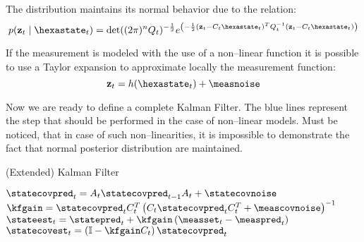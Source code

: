 The distribution maintains its normal behavior due to the relation:
\[p(\mathbf{z}_t\mid\hexastate_t) = \det((2\pi)^n Q_t)^{-\frac{1}{2}} e^{\left( -\frac{1}{2} (\mathbf{z}_t - C_t \hexastate_t)^T Q_t^{-1} (\mathbf{z}_t - C_t \hexastate_t) \right)}\]

If the measurement is modeled with the use of a non--linear function it is possible to use a Taylor expansion to approximate locally the measurement function:
\begin{equation}
\mathbf{z}_t = h(\hexastate_t) + \measnoise
\end{equation}

Now we are ready to define a complete Kalman Filter. The blue lines represent the step that should be performed in the case of non--linear models. Must be noticed, that in case of such non--linearities, it is impossible to demonstrate the fact that normal posterior distribution are maintained.
\begin{algorithm}[h]
\caption{(Extended) Kalman Filter}
${\statecovpred_t = A_t \statecovpred_{t-1} A_t + \statecovnoise}$ \;
${\kfgain = \statecovpred_t C_t^T \braces{ C_t \statecovpred_t C_t^T + \meascovnoise }^{-1}}$ \;
${\stateest_t = \statepred_t + \kfgain \braces{\measset_t - \measpred_t}}$ \;
${\statecovest_t = \braces{\mathbb{I} - \kfgain C_t} \statecovpred_t}$ \;
\end{algorithm}
\FloatBarrier
